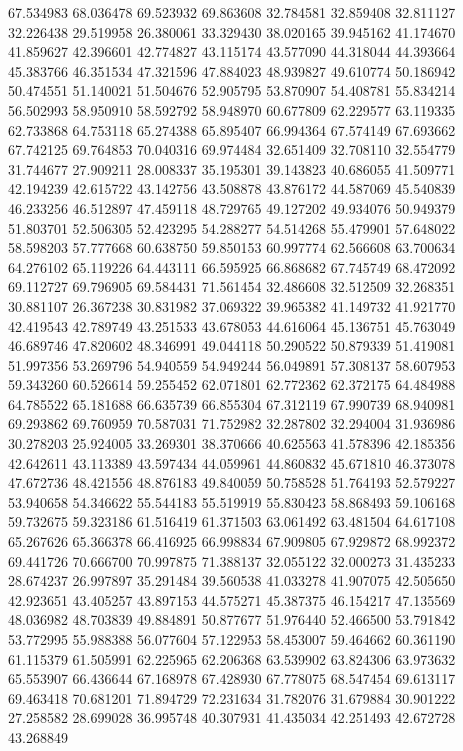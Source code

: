 67.534983
68.036478
69.523932
69.863608
32.784581
32.859408
32.811127
32.226438
29.519958
26.380061
33.329430
38.020165
39.945162
41.174670
41.859627
42.396601
42.774827
43.115174
43.577090
44.318044
44.393664
45.383766
46.351534
47.321596
47.884023
48.939827
49.610774
50.186942
50.474551
51.140021
51.504676
52.905795
53.870907
54.408781
55.834214
56.502993
58.950910
58.592792
58.948970
60.677809
62.229577
63.119335
62.733868
64.753118
65.274388
65.895407
66.994364
67.574149
67.693662
67.742125
69.764853
70.040316
69.974484
32.651409
32.708110
32.554779
31.744677
27.909211
28.008337
35.195301
39.143823
40.686055
41.509771
42.194239
42.615722
43.142756
43.508878
43.876172
44.587069
45.540839
46.233256
46.512897
47.459118
48.729765
49.127202
49.934076
50.949379
51.803701
52.506305
52.423295
54.288277
54.514268
55.479901
57.648022
58.598203
57.777668
60.638750
59.850153
60.997774
62.566608
63.700634
64.276102
65.119226
64.443111
66.595925
66.868682
67.745749
68.472092
69.112727
69.796905
69.584431
71.561454
32.486608
32.512509
32.268351
30.881107
26.367238
30.831982
37.069322
39.965382
41.149732
41.921770
42.419543
42.789749
43.251533
43.678053
44.616064
45.136751
45.763049
46.689746
47.820602
48.346991
49.044118
50.290522
50.879339
51.419081
51.997356
53.269796
54.940559
54.949244
56.049891
57.308137
58.607953
59.343260
60.526614
59.255452
62.071801
62.772362
62.372175
64.484988
64.785522
65.181688
66.635739
66.855304
67.312119
67.990739
68.940981
69.293862
69.760959
70.587031
71.752982
32.287802
32.294004
31.936986
30.278203
25.924005
33.269301
38.370666
40.625563
41.578396
42.185356
42.642611
43.113389
43.597434
44.059961
44.860832
45.671810
46.373078
47.672736
48.421556
48.876183
49.840059
50.758528
51.764193
52.579227
53.940658
54.346622
55.544183
55.519919
55.830423
58.868493
59.106168
59.732675
59.323186
61.516419
61.371503
63.061492
63.481504
64.617108
65.267626
65.366378
66.416925
66.998834
67.909805
67.929872
68.992372
69.441726
70.666700
70.997875
71.388137
32.055122
32.000273
31.435233
28.674237
26.997897
35.291484
39.560538
41.033278
41.907075
42.505650
42.923651
43.405257
43.897153
44.575271
45.387375
46.154217
47.135569
48.036982
48.703839
49.884891
50.877677
51.976440
52.466500
53.791842
53.772995
55.988388
56.077604
57.122953
58.453007
59.464662
60.361190
61.115379
61.505991
62.225965
62.206368
63.539902
63.824306
63.973632
65.553907
66.436644
67.168978
67.428930
67.778075
68.547454
69.613117
69.463418
70.681201
71.894729
72.231634
31.782076
31.679884
30.901222
27.258582
28.699028
36.995748
40.307931
41.435034
42.251493
42.672728
43.268849
